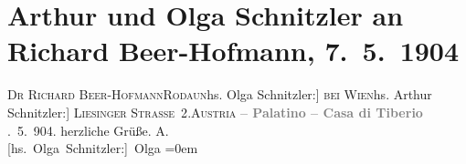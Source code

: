 

         
         \renewcommand{\erwaehntePersonen}{Personen: Richard Beer-Hofmann}
         \renewcommand{\erwaehnteOrte}{Orte: Domus Tiberiana, Liesingerstraße, Palatin, Rodaun, Rom, Wien, Österreich}
         \renewcommand{\erwaehnteWerke}{}
               \section[Arthur und Olga Schnitzler an Richard Beer-Hofmann, 7. 5. 1904]{ Arthur und Olga Schnitzler an Richard Beer-Hofmann,
                    7. 5. 1904}\nopagebreak{}\rehead{ }\begin{ledgroupsized}[t]{13cm}\normalsize\beginnumbering \toendnotes[C]{\smallbreak\pagebreak[2]} 
\pstart{}{\pb}\textsc{Dr Richard Beer-Hofmann}\pend{}\pstart{}\textsc{Rodaun}\introOben{}{[}hs. Olga Schnitzler:{]} \textsc{bei Wien}\introOben{}\pend{}\pstart{}{[}hs. Arthur Schnitzler:{]} \textsc{Liesinger Straße 2}.\pend{}\pstart{}\textsc{Austria}\pend{}{\bigskip}\pstart
           \noindent{}\centering{}{\pb}\textcolor{gray}{\textbf{ – Palatino – Casa di Tiberio}}\pend
           . 5. 904.\pend
           \pstart
           herzliche Grüße.\pend
           \pstart
           \spacefill\mbox{A.}{\\[\baselineskip]}\spacefill\mbox{{[}hs. Olga Schnitzler:{]} Olga}\pend
           \leftskip=0em{}
         
         \endnumbering{}\end{ledgroupsized}  \newcommand{\dateiname}{L01398}\newcommand{\titel}{Arthur und Olga Schnitzler an Richard Beer-Hofmann, 7. 5. 1904}\newcommand{\editorInnen}{Martin Anton Müller und Gerd-Hermann Susen}
      